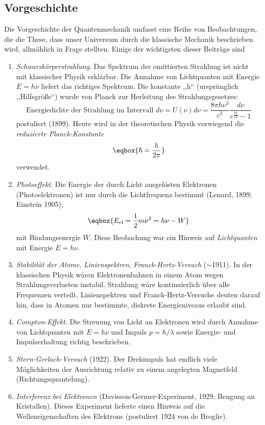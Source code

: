 \subsection{Vorgeschichte}
Die Vorgeschichte der Quantenmechanik umfasst eine Reihe von Beobachtungen, die die These, dass unser Universum durch die klassische Mechanik beschrieben wird, allmählich in Frage stellten. Einige der wichtigsten dieser Beiträge sind
\begin{enumerate}
	\item \emph{Schwarzkörperstrahlung}. Das Spektrum der emittierten Strahlung ist nicht mit klassischer Physik erklärbar. Die Annahme von Lichtquanten mit Energie $E=h\nu$ liefert das richtiges Spektrum. Die konstante ,,h`` (ursprünglich ,,Hilfsgröße``) wurde von Planck zur Herleitung des Strahlungsgesetzes:
	\begin{equation*}
		\text{Energiedichte der Strahlung im Intervall $d\nu$} = U(\nu)d\nu = \frac{8\pi h \nu^3}{c^3}\frac{d\nu}{e^{\frac{h\nu}{kT}}-1}
	\end{equation*}
	postuliert (1899). Heute wird in der theoretischen Physik vorwiegend die \emph{reduzierte Planck-Konstante} 
	\begin{equation*}
		\eqbox{\hbar = \frac{h}{2\pi}}
	\end{equation*}
	verwendet.
	\item \emph{Photoeffekt}. Die Energie der durch Licht ausgelösten Elektronen (Photoelektronen) ist nur durch die Lichtfrequenz bestimmt (Lenard, 1899; Einstein 1905):
	\begin{equation*}
		\eqbox{E_{\text{el}} = \frac12 m\nu^2 = h\nu -W}
	\end{equation*}
	mit Bindungsenergie $W$. Diese Beobachung war ein Hinweis auf \emph{Lichtquanten} mit Energie $E=h\nu$.
	\item \emph{Stabilität der Atome}, \emph{Linienspektren}, \emph{Franck-Hertz-Versuch} ($\sim$1911). In der klassischen Physik wären Elektronenbahnen in einem Atom wegen Strahlungsverlusten instabil. Strahlung wäre kontinuierlich über alle Frequenzen verteilt. Linienspektren und Franck-Hertz-Versuche deuten darauf hin, dass in Atomen nur bestimmte, diskrete Energieniveaus erlaubt sind. 
	\item \emph{Compton-Effekt}. Die Streuung von Licht an Elektronen wird durch Annahme von Lichtquanten mit $E=h\nu$ und Impuls $p=h/\lambda$ sowie Energie- und Impulserhaltung richtig beschrieben. 
	\item \emph{Stern-Gerlach-Versuch} (1922). Der Drehimpuls hat endlich viele Möglichkeiten der Ausrichtung relativ zu einem angelegten Magnetfeld (Richtungsquantelung).
	\item \emph{Interferenz bei Elektronen} (Davisson-Germer-Experiment, 1929; Beugung an Kristallen). Dieses Experiment lieferte einen Hinweis auf die Welleneigenschaften des Elektrons (postuliert 1924 von de Broglie).
\end{enumerate}

